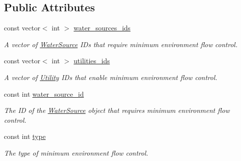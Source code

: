 \subsection*{Public Attributes}
\begin{DoxyCompactItemize}
\item 
const vector$<$ int $>$ \mbox{\hyperlink{classMinEnvFlowControl_a775d6408e5c581754ee4240eea68abdc}{water\+\_\+sources\+\_\+ids}}
\begin{DoxyCompactList}\small\item\em A vector of \mbox{\hyperlink{classWaterSource}{Water\+Source}} I\+Ds that require minimum environment flow control. \end{DoxyCompactList}\item 
const vector$<$ int $>$ \mbox{\hyperlink{classMinEnvFlowControl_a5c67ab20c181a1d22e4bf94e398451fc}{utilities\+\_\+ids}}
\begin{DoxyCompactList}\small\item\em A vector of \mbox{\hyperlink{classUtility}{Utility}} I\+Ds that enable minimum environment flow control. \end{DoxyCompactList}\item 
const int \mbox{\hyperlink{classMinEnvFlowControl_aada518a047598f386daec1d0358023aa}{water\+\_\+source\+\_\+id}}
\begin{DoxyCompactList}\small\item\em The ID of the \mbox{\hyperlink{classWaterSource}{Water\+Source}} object that requires minimum environment flow control. \end{DoxyCompactList}\item 
const int \mbox{\hyperlink{classMinEnvFlowControl_abc3f168cd1ec36ba59e4b8604dfae8ec}{type}}
\begin{DoxyCompactList}\small\item\em The type of minimum environment flow control. \end{DoxyCompactList}\end{DoxyCompactItemize}
